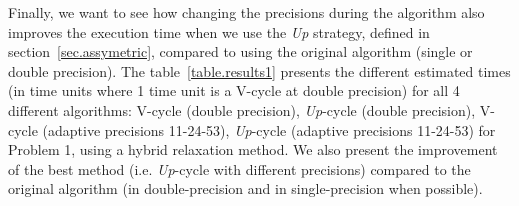    Finally, we want to see how changing the precisions during the algorithm also improves the execution time when we use the \emph{Up} strategy, defined in section~\ref{sec.assymetric}, compared to using the original algorithm (single or double precision).
   The table~\ref{table.results1} presents the different estimated times (in time units where 1 time unit is a V-cycle at double precision)
   for all 4 different algorithms: V-cycle (double precision), \emph{Up}-cycle (double precision), V-cycle (adaptive precisions 11-24-53), \emph{Up}-cycle (adaptive precisions 11-24-53) for Problem 1, using a hybrid relaxation method.
   We also present the improvement of the best method (i.e. \emph{Up}-cycle with different precisions) compared to the original algorithm (in double-precision and in single-precision when possible).
  
